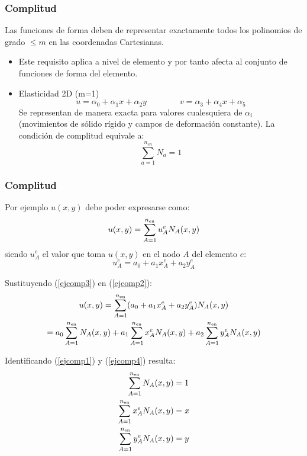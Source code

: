 \documentclass[handout]{beamer}
\begin{document}
\begin{frame}
\frametitle{Complitud}
Las funciones de forma deben de representar exactamente todos los polinomios
de grado $\leq m$ en las coordenadas Cartesianas.
\begin{itemize}
\item Este requisito aplica a nivel de elemento y por tanto afecta al conjunto
de funciones de forma del elemento.
\item Elasticidad 2D (m=1)
\begin{equation}
u=\alpha_0 + \alpha_1 x + \alpha_2 y \qquad \qquad
v=\alpha_3 + \alpha_4 x + \alpha_5 \label{ejcomp1}
\end{equation}
Se representan de manera exacta para valores cualesquiera de $\alpha_i$ (movimientos de sólido rígido y campos de deformación constante). La condición de complitud equivale a:
$$
\sum_{a=1}^{n_{en}} N_a = 1
$$
\end{itemize}
\end{frame}
\begin{frame}
	\frametitle{Complitud}
Por ejemplo $u(x,y)$ debe poder expresarse como:
\begin{equation}
	u(x,y)=\sum_{A=1}^{n_{\rm en}} u^e_A N_A(x,y) \label{ejcomp2}
\end{equation}
siendo $u^e_A$ el valor que toma $u(x,y)$ en el nodo $A$ del elemento $e$:
\begin{equation}
	u^e_A=a_0+a_1 x^e_A + a_2 y^e_A \label{ejcomp3}
\end{equation}

Sustituyendo (\ref{ejcomp3}) en (\ref{ejcomp2}):
\begin{multline}
	u(x,y)=\sum_{A=1}^{n_{\rm en}} (a_0+a_1 x^e_A + a_2 y^e_A) N_A(x,y) \\
	=a_0 \sum_{A=1}^{n_{\rm en}} N_A(x,y)     +
	a_1 \sum_{A=1}^{n_{\rm en}} x^e_A N_A(x,y) +
	a_2 \sum_{A=1}^{n_{\rm en}} y^e_A N_A(x,y)     \label{ejcomp4}
\end{multline}
\end{frame}
\begin{frame}
Identificando (\ref{ejcomp1}) y (\ref{ejcomp4}) resulta:
\begin{align}
	\sum_{A=1}^{n_{\rm en}} N_A(x,y) &= 1 \label{ejcomp5}  \\
	\sum_{A=1}^{n_{\rm en}} x^e_A N_A(x,y) &= x \label{ejcomp6}  \\
	\sum_{A=1}^{n_{\rm en}} y^e_A N_A(x,y) &= y \label{ejcomp7}
\end{align}
\end{frame}
\end{document}
